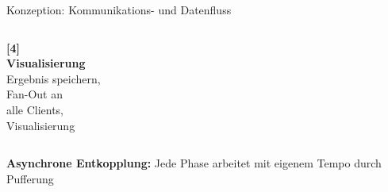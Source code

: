 \begin{frame}{Konzeption: Kommunikations- und Datenfluss}{}
\begin{columns}[T]
        \begin{tcolorbox}[box4, height=2.75cm, boxsep=0.2em]
            \centering
            \textcolor{red!70}{\textbf{[4]}}\\
            \textbf{Visualisierung}\\
            \vspace{0.2em}
            \small Ergebnis speichern,\\
            Fan-Out an\\
            alle Clients,\\
            Visualisierung
        \end{tcolorbox}
    \end{columns}
    
    \vfill
    \begin{tcolorbox}[box5, boxsep=0.5em]
        \centering
        \textbf{Asynchrone Entkopplung:} Jede Phase arbeitet mit eigenem Tempo durch Pufferung
    \end{tcolorbox}
\end{frame}
